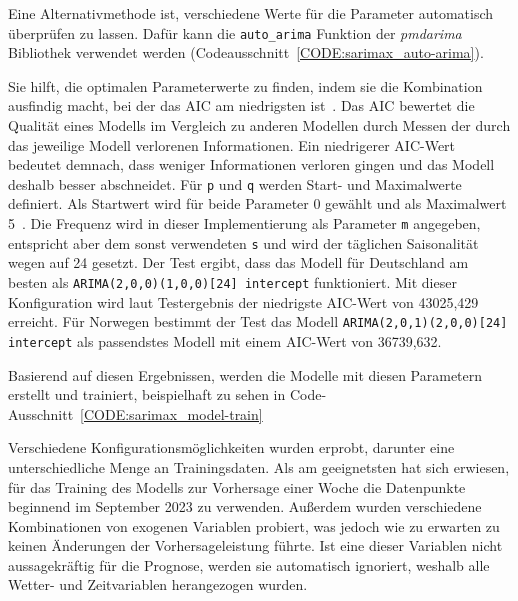 Eine Alternativmethode ist, verschiedene Werte für die Parameter automatisch überprüfen zu lassen.
Dafür kann die \lstinline[columns=fixed]{auto_arima} Funktion der \textit{pmdarima} Bibliothek verwendet werden (Codeausschnitt~\ref{CODE:sarimax_auto-arima}).

Sie hilft, die optimalen Parameterwerte zu finden, indem sie die Kombination ausfindig macht, bei der das \ac{AIC} am niedrigsten ist~\cite{Rahmadhan.8.5.2023}.
Das \ac{AIC} bewertet die Qualität eines Modells im Vergleich zu anderen Modellen durch Messen der durch das jeweilige Modell verlorenen Informationen.
Ein niedrigerer \ac{AIC}-Wert bedeutet demnach, dass weniger Informationen verloren gingen und das Modell deshalb besser abschneidet.
Für \lstinline[columns=fixed]{p} und \lstinline[columns=fixed]{q} werden Start- und Maximalwerte definiert.
Als Startwert wird für beide Parameter 0 gewählt und als Maximalwert 5~\cite{Peixeiro.2022}.
Die Frequenz wird in dieser Implementierung als Parameter \lstinline[columns=fixed]{m} angegeben, entspricht aber dem sonst verwendeten \lstinline[columns=fixed]{s} und wird der täglichen Saisonalität wegen auf 24 gesetzt.
Der Test ergibt, dass das Modell für Deutschland am besten als \lstinline[columns=fixed]{ARIMA(2,0,0)(1,0,0)[24] intercept} funktioniert.
Mit dieser Konfiguration wird laut Testergebnis der niedrigste \ac{AIC}-Wert von 43025,429 erreicht.
Für Norwegen bestimmt der Test das Modell \lstinline[columns=fixed]{ARIMA(2,0,1)(2,0,0)[24] intercept} als passendstes Modell mit einem \ac{AIC}-Wert von 36739,632.

Basierend auf diesen Ergebnissen, werden die Modelle mit diesen Parametern erstellt und trainiert, beispielhaft zu sehen in Code-Ausschnitt~\ref{CODE:sarimax_model-train}


Verschiedene Konfigurationsmöglichkeiten wurden erprobt, darunter eine unterschiedliche Menge an Trainingsdaten.
Als am geeignetsten hat sich erwiesen, für das Training des Modells zur Vorhersage einer Woche die Datenpunkte beginnend im September 2023 zu verwenden.
Außerdem wurden verschiedene Kombinationen von exogenen Variablen probiert, was jedoch wie zu erwarten zu keinen Änderungen der Vorhersageleistung führte.
Ist eine dieser Variablen nicht aussagekräftig für die Prognose, werden sie automatisch ignoriert, weshalb alle Wetter- und Zeitvariablen herangezogen wurden.

